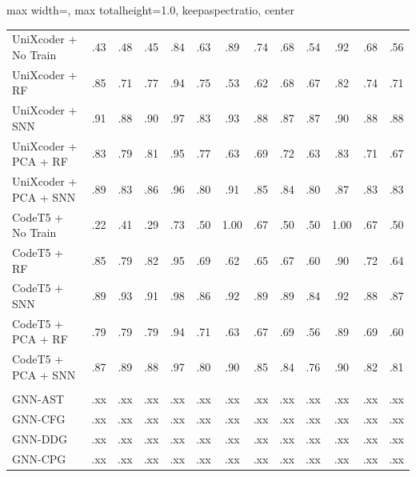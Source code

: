 \documentclass[final,5p,times,twocolumn]{elsarticle}
\theoremstyle{plain}
\begin{document}
\begin{table}[!htbp]
\begin{adjustbox}{
    max width=\columnwidth,
    max totalheight=1.0\textheight,
    keepaspectratio,
    center
}
\begin{tabular}{@{}l*{12}{c}@{}}
UniXcoder + No Train
& .43 & .48 & .45 & .84
& .63 & .89 & .74 & .68
& .54 & .92 & .68 & .56 \\

UniXcoder + RF
& .85 & .71 & .77 & .94
& .75 & .53 & .62 & .68
& .67 & .82 & .74 & .71 \\

\rowcolor{green!15}
UniXcoder + SNN
& .91 & .88 & .90 & .97
& .83 & .93 & .88 & .87
& .87 & .90 & .88 & .88 \\

UniXcoder + PCA + RF
& .83 & .79 & .81 & .95
& .77 & .63 & .69 & .72
& .63 & .83 & .71 & .67 \\

UniXcoder + PCA + SNN
& .89 & .83 & .86 & .96
& .80 & .91 & .85 & .84
& .80 & .87 & .83 & .83 \\

CodeT5 + No Train
& .22 & .41 & .29 & .73
& .50 & 1.00 & .67 & .50
& .50 & 1.00 & .67 & .50 \\

CodeT5 + RF
& .85 & .79 & .82 & .95
& .69 & .62 & .65 & .67
& .60 & .90 & .72 & .64 \\

CodeT5 + SNN
& .89 & .93 & .91 & .98
& .86 & .92 & .89 & .89
& .84 & .92 & .88 & .87 \\

CodeT5 + PCA + RF
& .79 & .79 & .79 & .94
& .71 & .63 & .67 & .69
& .56 & .89 & .69 & .60 \\

CodeT5 + PCA + SNN
& .87 & .89 & .88 & .97
& .80 & .90 & .85 & .84
& .76 & .90 & .82 & .81 \\

\rowcolor{black!7}
\multicolumn{13}{@{}l}{\textit{GNN baselines}}\\[0pt]

GNN-AST
& .xx & .xx & .xx & .xx
& .xx & .xx & .xx & .xx
& .xx & .xx & .xx & .xx \\

GNN-CFG
& .xx & .xx & .xx & .xx
& .xx & .xx & .xx & .xx
& .xx & .xx & .xx & .xx \\

GNN-DDG
& .xx & .xx & .xx & .xx
& .xx & .xx & .xx & .xx
& .xx & .xx & .xx & .xx \\

GNN-CPG
& .xx & .xx & .xx & .xx
& .xx & .xx & .xx & .xx
& .xx & .xx & .xx & .xx \\

\bottomrule
\end{tabular}
\end{adjustbox}

\end{table}
\end{document}
